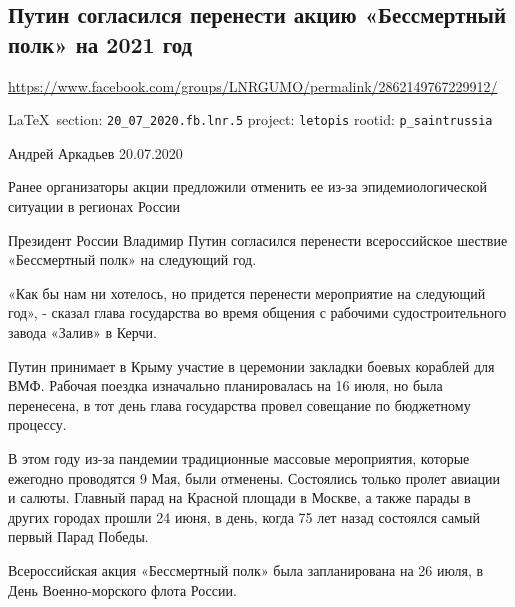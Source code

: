  
 

\subsection{Путин согласился перенести акцию «Бессмертный полк» на 2021 год}
\url{https://www.facebook.com/groups/LNRGUMO/permalink/2862149767229912/}
  
\vspace{0.5cm}
{\small\LaTeX~section: \verb|20_07_2020.fb.lnr.5| project: \verb|letopis| rootid: \verb|p_saintrussia|}
\vspace{0.5cm}

Андрей Аркадьев 20.07.2020

Ранее организаторы акции предложили отменить ее из-за эпидемиологической
ситуации в регионах России

Президент России Владимир Путин согласился перенести всероссийское шествие
«Бессмертный полк» на следующий год.

«Как бы нам ни хотелось, но придется перенести мероприятие на следующий год», -
сказал глава государства во время общения с рабочими судостроительного завода
«Залив» в Керчи.

Путин принимает в Крыму участие в церемонии закладки боевых кораблей для ВМФ.
Рабочая поездка изначально планировалась на 16 июля, но была перенесена, в тот
день глава государства провел совещание по бюджетному процессу.

В этом году из-за пандемии традиционные массовые мероприятия, которые ежегодно
проводятся 9 Мая, были отменены. Состоялись только пролет авиации и салюты.
Главный парад на Красной площади в Москве, а также парады в других городах
прошли 24 июня, в день, когда 75 лет назад состоялся самый первый Парад Победы.

Всероссийская акция «Бессмертный полк» была запланирована на 26 июля, в День
Военно-морского флота России. 
